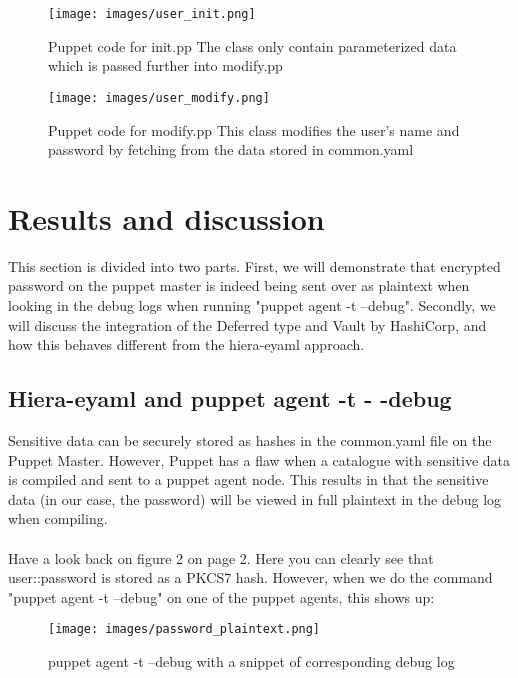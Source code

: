 \begin{figure}[h!]
  \texttt{[image: images/user\_init.png]}  
  \caption{Puppet code for init.pp The class only contain parameterized data which is passed further into modify.pp}
\end{figure}

\begin{figure}[h!]
  \texttt{[image: images/user\_modify.png]}  
  \caption{Puppet code for modify.pp This class modifies the user's name and password by fetching from the data stored in common.yaml}
\end{figure}




\section{Results and discussion}


This section is divided into two parts. First, we will demonstrate that encrypted password on the puppet master is indeed being sent over as plaintext when looking in the debug logs when running "puppet agent -t --debug".
Secondly, we will discuss the integration of the Deferred type and Vault by HashiCorp, and how this behaves different from the hiera-eyaml approach.

\subsection{Hiera-eyaml and puppet agent -t - -debug}
Sensitive data can be securely stored as hashes in the common.yaml file on the Puppet Master. However, Puppet has a flaw when a catalogue with sensitive data is compiled and sent to a puppet agent node. This results in that the sensitive data (in our case, the password) will be viewed in full plaintext in the debug log when compiling.
\\\\
Have a look back on figure 2 on page 2. Here you can clearly see that user::password is stored as a PKCS7 hash. However, when we do the command "puppet agent -t --debug" on one of the puppet agents, this shows up:

\begin{figure}[h!]
  \texttt{[image: images/password\_plaintext.png]}  \caption{puppet agent -t --debug with a snippet of corresponding debug log}
\end{figure}

